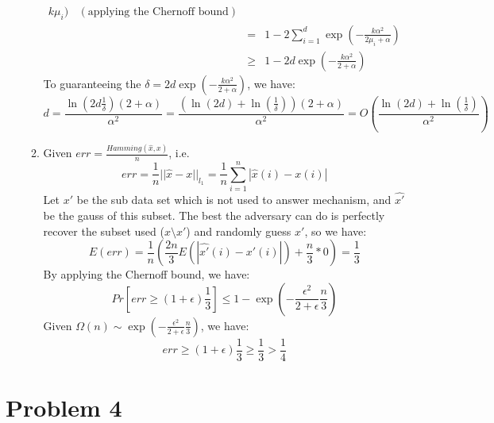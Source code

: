 \documentclass[11pt]{article}
\begin{document}
\begin{enumerate}
\begin{enumerate}
\[\begin{array}{ccl}
		k \mu_i) 
		~~~~(\text{applying the Chernoff bound})\\
		& = & 1 - 2 \sum\limits_{i = 1}^{d}
		\exp(- \frac{k \alpha^2}{ 2\mu_i + \alpha })\\
		& \geq & 1 - 2d\exp(- \frac{k \alpha^2}{ 2 + \alpha })
		\end{array}
		\] 
		To guaranteeing the $\delta = 2d\exp(- \frac{k \alpha^2}{ 2 + \alpha })$, we have:
		\[
		d = \frac{\ln(2d \frac{1}{\delta})(2 + \alpha)}
		{\alpha^2}
		= \frac{(\ln(2d) + \ln( \frac{1}{\delta}))(2 + \alpha)}
		{\alpha^2}
		= O(\frac{\ln(2d) + \ln( \frac{1}{\delta})}
		{\alpha^2})
		\]
		\item
		Given $err = \frac{Hamming(\hat{x}, x)}{n}$, i.e.
		$$err = \frac{1}{n}||\hat{x} - x||_{l_1} 
		= \frac{1}{n} \sum_{i = 1}^{n} |\hat{x}(i) - x(i)|$$
		Let $x'$ be the sub data set which is not used to answer mechanism, and $\hat{x'}$ be the gauss of this subset.
		The best the adversary can do is perfectly recover the subset used ($x \setminus x'$) and randomly guess $x'$, so we have:
		\[
		E(err)  = \frac{1}{n}( \frac{2 n}{3} E(|\hat{x'}(i) - x'(i)|) + \frac{n}{3} * 0) = \frac{1}{3}
		\]
		By applying the Chernoff bound, we have:
		\[
		Pr[err \geq (1 + \epsilon) \frac{1}{3}]
		\leq 1 - \exp(- \frac{\epsilon^2}{2 + \epsilon} \frac{n}{3})
		\]
		Given $\Omega(n) \sim \exp(- \frac{\epsilon^2}{2 + \epsilon} \frac{n}{3})$, we have:
		\[
		err \geq (1 + \epsilon) \frac{1}{3} \geq \frac{1}{3} > \frac{1}{4}
		\]

	\end{enumerate}
\end{enumerate}

\section{Problem 4}
\end{document}
